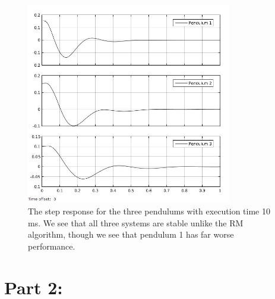\documentclass[10pt,a4paper]{article}
\begin{document}
\begin{figure}[!h]
  \centering
    \includegraphics[width=0.8\textwidth]{10msedf.jpg}
      \caption{The step response for the three pendulums with execution time 10 ms. We see that all three systems are stable unlike the RM algorithm, though we see that pendulum 1 has far worse performance.}
\end{figure}

\newpage
\section*{Part 2:}
\end{document}
